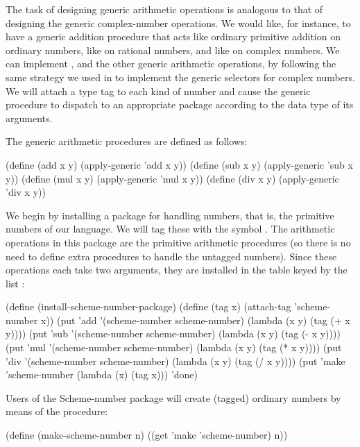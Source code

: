 The task of designing generic arithmetic operations is analogous to that of
designing the generic complex-number operations.  We would like, for instance,
to have a generic addition procedure  that acts like ordinary
primitive addition \code{+} on ordinary numbers, like  on
rational numbers, and like  on complex numbers.  We can
implement , and the other generic arithmetic operations, by following
the same strategy we used in  to implement the generic
selectors for complex numbers.  We will attach a type tag to each kind of
number and cause the generic procedure to dispatch to an appropriate package
according to the data type of its arguments.

The generic arithmetic procedures are defined as follows:

\begin{codeBlock}
(define (add x y) (apply-generic 'add x y))
(define (sub x y) (apply-generic 'sub x y))
(define (mul x y) (apply-generic 'mul x y))
(define (div x y) (apply-generic 'div x y))
\end{codeBlock}

\noindent
We begin by installing a package for handling  numbers, that
is, the primitive numbers of our language.  We will tag these with the symbol
.  The arithmetic operations in this package are the
primitive arithmetic procedures (so there is no need to define extra procedures
to handle the untagged numbers).  Since these operations each take two
arguments, they are installed in the table keyed by the list
:

\begin{codeBlock}
(define (install-scheme-number-package)
  (define (tag x) (attach-tag 'scheme-number x))
  (put 'add '(scheme-number scheme-number)
       (lambda (x y) (tag (+ x y))))
  (put 'sub '(scheme-number scheme-number)
       (lambda (x y) (tag (- x y))))
  (put 'mul '(scheme-number scheme-number)
       (lambda (x y) (tag (* x y))))
  (put 'div '(scheme-number scheme-number)
       (lambda (x y) (tag (/ x y))))
  (put 'make 'scheme-number (lambda (x) (tag x)))
  'done)
\end{codeBlock}

\noindent
Users of the Scheme-number package will create (tagged) ordinary numbers by
means of the procedure:

\begin{codeBlock}
(define (make-scheme-number n)
  ((get 'make 'scheme-number) n))
\end{codeBlock}

